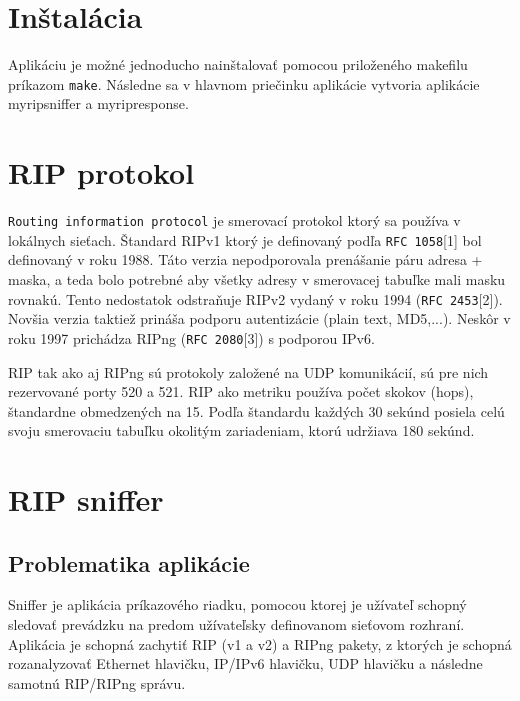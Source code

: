 \documentclass{report}
\begin{document}
	\section{Inštalácia}
	
	Aplikáciu je možné jednoducho nainštalovať pomocou priloženého makefilu príkazom \verb|make|. Následne sa v hlavnom priečinku aplikácie vytvoria aplikácie myripsniffer a myripresponse.
	
	\section{RIP protokol}
	
	\verb|Routing information protocol| je smerovací protokol ktorý sa používa v lokálnych sieťach. Štandard RIPv1 ktorý je definovaný podľa \verb|RFC 1058|[1] bol definovaný v roku 1988. Táto verzia nepodporovala prenášanie páru adresa + maska, a teda bolo potrebné aby všetky adresy v smerovacej tabuľke mali masku rovnakú. Tento nedostatok odstraňuje RIPv2 vydaný v roku 1994 (\verb|RFC 2453|[2]). Novšia verzia taktiež prináša podporu autentizácie (plain text, MD5,...). Neskôr v roku 1997 prichádza RIPng (\verb|RFC 2080|[3]) s podporou IPv6.
	
	RIP tak ako aj RIPng sú protokoly založené na UDP komunikácií, sú pre nich rezervované porty 520 a 521. RIP ako metriku používa počet skokov (hops), štandardne obmedzených na 15. Podľa štandardu každých 30 sekúnd posiela celú svoju smerovaciu tabuľku okolitým zariadeniam, ktorú udržiava 180 sekúnd.
	
	\newpage
	
	\section{RIP sniffer}
	\subsection{Problematika aplikácie}
    Sniffer je aplikácia príkazového riadku, pomocou ktorej je užívateľ schopný sledovať prevádzku na predom užívateľsky definovanom sieťovom rozhraní. Aplikácia je schopná zachytiť RIP (v1 a v2) a RIPng pakety, z ktorých je schopná rozanalyzovať Ethernet hlavičku, IP/IPv6 hlavičku, UDP hlavičku a následne samotnú RIP/RIPng správu.
    
    
\end{document}
